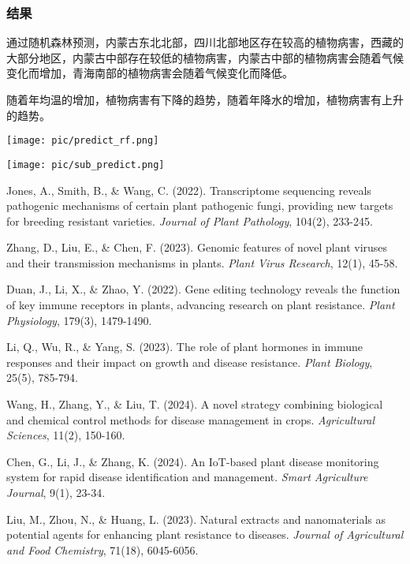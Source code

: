 \documentclass{article}
\begin{document}
\subsubsection{结果}
通过随机森林预测，内蒙古东北北部，四川北部地区存在较高的植物病害，西藏的大部分地区，内蒙古中部存在较低的植物病害，内蒙古中部的植物病害会随着气候变化而增加，青海南部的植物病害会随着气候变化而降低。

随着年均温的增加，植物病害有下降的趋势，随着年降水的增加，植物病害有上升的趋势。

\par
\texttt{[image: pic/predict\_rf.png]} %
\par
\texttt{[image: pic/sub\_predict.png]} %
\begin{thebibliography}{99}
Jones, A., Smith, B., \& Wang, C. (2022). Transcriptome sequencing reveals pathogenic mechanisms of certain plant pathogenic fungi, providing new targets for breeding resistant varieties. \textit{Journal of Plant Pathology}, 104(2), 233-245.

Zhang, D., Liu, E., \& Chen, F. (2023). Genomic features of novel plant viruses and their transmission mechanisms in plants. \textit{Plant Virus Research}, 12(1), 45-58.

Duan, J., Li, X., \& Zhao, Y. (2022). Gene editing technology reveals the function of key immune receptors in plants, advancing research on plant resistance. \textit{Plant Physiology}, 179(3), 1479-1490.

Li, Q., Wu, R., \& Yang, S. (2023). The role of plant hormones in immune responses and their impact on growth and disease resistance. \textit{Plant Biology}, 25(5), 785-794.

Wang, H., Zhang, Y., \& Liu, T. (2024). A novel strategy combining biological and chemical control methods for disease management in crops. \textit{Agricultural Sciences}, 11(2), 150-160.

Chen, G., Li, J., \& Zhang, K. (2024). An IoT-based plant disease monitoring system for rapid disease identification and management. \textit{Smart Agriculture Journal}, 9(1), 23-34.

Liu, M., Zhou, N., \& Huang, L. (2023). Natural extracts and nanomaterials as potential agents for enhancing plant resistance to diseases. \textit{Journal of Agricultural and Food Chemistry}, 71(18), 6045-6056.
	

\end{thebibliography}
\end{document}
